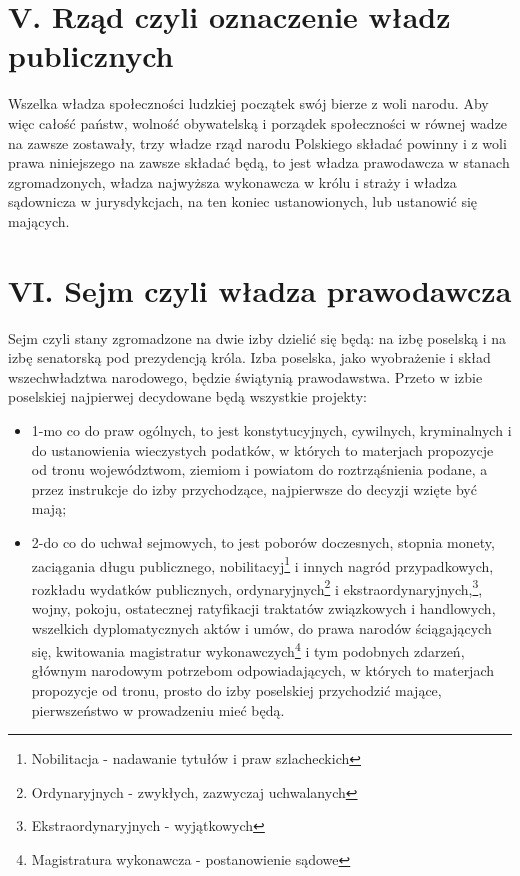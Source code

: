 \documentclass{book}
\begin{document}
\section*{V. Rząd czyli oznaczenie władz publicznych}

 Wszelka władza społeczności ludzkiej początek swój bierze z woli narodu. Aby więc całość państw, wolność obywatelską i porządek społeczności w równej wadze na zawsze zostawały, trzy władze rząd narodu Polskiego składać powinny  i z woli prawa niniejszego na zawsze składać będą, to jest władza prawodawcza w stanach zgromadzonych, władza najwyższa wykonawcza w królu i straży i władza sądownicza w jurysdykcjach, na ten koniec ustanowionych, lub ustanowić się mających. 

 
\section*{VI. Sejm czyli władza prawodawcza}

 Sejm czyli stany zgromadzone na dwie izby dzielić się będą: na izbę poselską i na izbę senatorską pod prezydencją króla. Izba poselska, jako wyobrażenie i skład wszechwładztwa narodowego, będzie świątynią prawodawstwa. Przeto w izbie poselskiej najpierwej decydowane będą wszystkie projekty:  
\begin{itemize}
\item 1-mo co do praw ogólnych, to jest konstytucyjnych, cywilnych, kryminalnych i do ustanowienia wieczystych podatków, w których to materjach propozycje od tronu województwom, ziemiom i powiatom do roztrząśnienia podane, a przez instrukcje do izby przychodzące, najpierwsze do decyzji wzięte być mają; 
\item 2-do co do uchwał sejmowych, to jest poborów doczesnych, stopnia monety, zaciągania długu publicznego, nobilitacyj\footnote{Nobilitacja - nadawanie tytułów i praw szlacheckich} i innych nagród przypadkowych, rozkładu wydatków publicznych, ordynaryjnych\footnote{Ordynaryjnych - zwykłych, zazwyczaj uchwalanych} i ekstraordynaryjnych,\footnote{Ekstraordynaryjnych - wyjątkowych}, wojny, pokoju, ostatecznej ratyfikacji traktatów związkowych i handlowych, wszelkich dyplomatycznych aktów i umów, do prawa narodów ściągających się,  kwitowania magistratur wykonawczych\footnote{Magistratura wykonawcza - postanowienie sądowe} i tym podobnych zdarzeń, głównym narodowym potrzebom odpowiadających, w których to materjach propozycje od tronu, prosto do izby poselskiej przychodzić mające,  pierwszeństwo w prowadzeniu mieć będą. 
\end{itemize}
\end{document}
